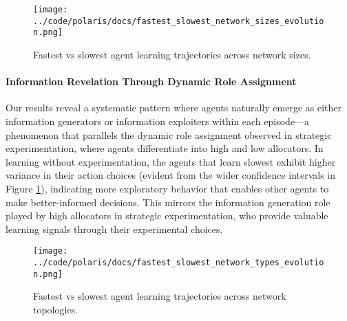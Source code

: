 \begin{figure}[!htbp]
    \centering
    \texttt{[image: ../code/polaris/docs/fastest\_slowest\_network\_sizes\_evolution.png]}
    \caption{Fastest vs slowest agent learning trajectories across network sizes.}
    \label{fig:size_comparison}
\end{figure}

\paragraph{Information Revelation Through Dynamic Role Assignment} Our results reveal a systematic pattern where agents naturally emerge as either information generators or information exploiters within each episode—a phenomenon that parallels the dynamic role assignment observed in strategic experimentation, where agents differentiate into high and low allocators. In learning without experimentation, the agents that learn slowest exhibit higher variance in their action choices (evident from the wider confidence intervals in Figure \ref{fig:size_comparison}), indicating more exploratory behavior that enables other agents to make better-informed decisions. This mirrors the information generation role played by high allocators in strategic experimentation, who provide valuable learning signals through their experimental choices.

\iffalse
Crucially, this division of labor emerges dynamically in both scenarios—different agents assume these roles across episodes (Figure \ref{fig:slowest_agent_network_positions}), suggesting the phenomenon arises from learning dynamics rather than fixed agent characteristics. This consistency across fundamentally different social learning environments demonstrates that dynamic role assignment represents a robust feature of multi-agent learning systems, where complementary specialization enhances collective information processing regardless of whether the mechanism operates through allocation patterns or exploration variance.
\fi


\begin{figure}[!htbp]
    \centering
    \texttt{[image: ../code/polaris/docs/fastest\_slowest\_network\_types\_evolution.png]}
    \caption{Fastest vs slowest agent learning trajectories across network topologies.}
    \label{fig:type_comparison}
\end{figure}


